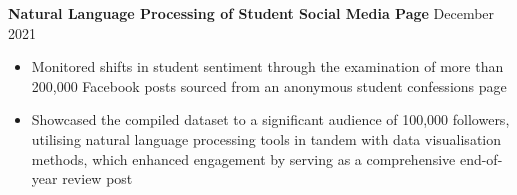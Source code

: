 \documentclass{article}
\begin{document}

\textbf{Natural Language Processing of Student Social Media Page} \hfill December 2021
\begin{itemize}
    \item Monitored shifts in student sentiment through the examination of more than 200,000 Facebook posts sourced from an anonymous student confessions page
    \item Showcased the compiled dataset to a significant audience of 100,000 followers, utilising natural language processing tools in tandem with data visualisation methods, which enhanced engagement by serving as a comprehensive end-of-year review post
\end{itemize} \medskip

\end{document}
